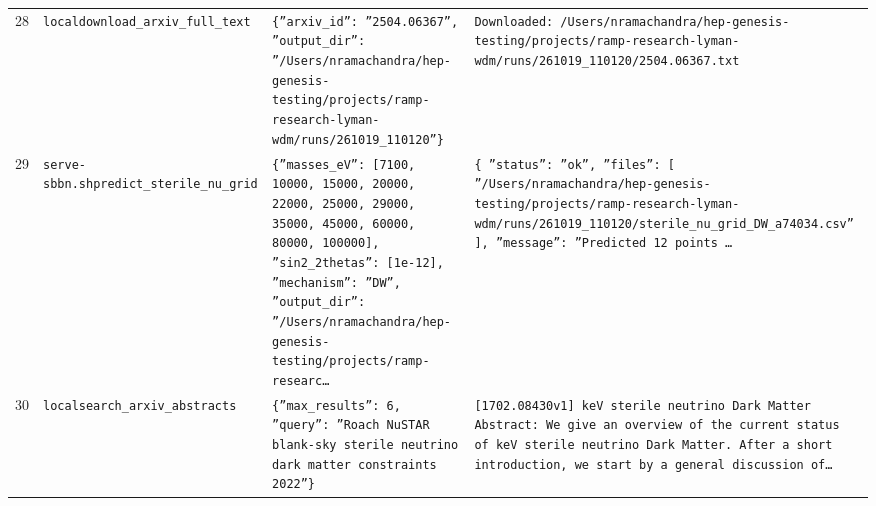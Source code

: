 \documentclass[11pt,a4paper]{article}
\begin{document}
\begin{longtable}{@{}p{}p{}p{}p{}@{}}
28 & \texttt{local}\newline\texttt{download\_\allowbreak{}arxiv\_\allowbreak{}full\_\allowbreak{}text} & \texttt{\{''arxiv\_\allowbreak{}id'':\allowbreak{} ''2504.06367'',\allowbreak{} ''output\_\allowbreak{}dir'':\allowbreak{} ''/\allowbreak{}Users/\allowbreak{}nramachandra/\allowbreak{}hep-genesis-testing/\allowbreak{}projects/\allowbreak{}ramp-research-lyman-wdm/\allowbreak{}runs/\allowbreak{}261019\_\allowbreak{}110120''\}\allowbreak{}} & \texttt{Downloaded:\allowbreak{} /\allowbreak{}Users/\allowbreak{}nramachandra/\allowbreak{}hep-genesis-testing/\allowbreak{}projects/\allowbreak{}ramp-research-lyman-wdm/\allowbreak{}runs/\allowbreak{}261019\_\allowbreak{}110120/\allowbreak{}2504.06367.txt} \\
29 & \texttt{serve-sbbn.sh}\newline\texttt{predict\_\allowbreak{}sterile\_\allowbreak{}nu\_\allowbreak{}grid} & \texttt{\{''masses\_\allowbreak{}eV'':\allowbreak{} [7100,\allowbreak{} 10000,\allowbreak{} 15000,\allowbreak{} 20000,\allowbreak{} 22000,\allowbreak{} 25000,\allowbreak{} 29000,\allowbreak{} 35000,\allowbreak{} 45000,\allowbreak{} 60000,\allowbreak{} 80000,\allowbreak{} 100000]\allowbreak{},\allowbreak{} ''sin2\_\allowbreak{}2thetas'':\allowbreak{} [1e-12]\allowbreak{},\allowbreak{} ''mechanism'':\allowbreak{} ''DW'',\allowbreak{} ''output\_\allowbreak{}dir'':\allowbreak{} ''/\allowbreak{}Users/\allowbreak{}nramachandra/\allowbreak{}hep-genesis-testing/\allowbreak{}projects/\allowbreak{}ramp-researc\ldots{}\allowbreak{}} & \texttt{\{   ''status'':\allowbreak{} ''ok'',\allowbreak{}   ''files'':\allowbreak{} [     ''/\allowbreak{}Users/\allowbreak{}nramachandra/\allowbreak{}hep-genesis-testing/\allowbreak{}projects/\allowbreak{}ramp-research-lyman-wdm/\allowbreak{}runs/\allowbreak{}261019\_\allowbreak{}110120/\allowbreak{}sterile\_\allowbreak{}nu\_\allowbreak{}grid\_\allowbreak{}DW\_\allowbreak{}a74034.csv''   ]\allowbreak{},\allowbreak{}   ''message'':\allowbreak{} ''Predicted 12 points \ldots{}\allowbreak{}} \\
30 & \texttt{local}\newline\texttt{search\_\allowbreak{}arxiv\_\allowbreak{}abstracts} & \texttt{\{''max\_\allowbreak{}results'':\allowbreak{} 6,\allowbreak{} ''query'':\allowbreak{} ''Roach NuSTAR blank-sky sterile neutrino dark matter constraints 2022''\}\allowbreak{}} & \texttt{[1702.08430v1]\allowbreak{} keV sterile neutrino Dark Matter Abstract:\allowbreak{} We give an overview of the current status of keV sterile neutrino Dark Matter. After a short introduction,\allowbreak{} we start by a general discussion of\ldots{}\allowbreak{}} \\

\end{longtable}
\end{document}
